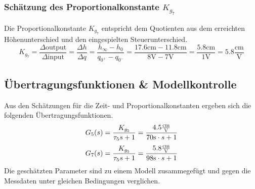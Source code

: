 \subsubsection{Schätzung des Proportionalkonstante $K_{g_7}$}
Die Proportionalkonstante $K_{g_7}$ entspricht dem Quotienten aus dem
erreichten Höhenunterschied und den eingespielten Steuerunterschied.
\[
	K_{g_7}
	= \frac{\Delta \text{output}}{\Delta \text{input}}
	= \frac{\Delta h}{\Delta q}
	= \frac{h_\infty - h_0}{q_{0^+} - q_{0^-}}
	= \frac{17.6\si{\centi\meter} - 11.8\si{\centi\meter}}{8\si{\volt}
		-  7\si{\volt}}
	= \frac{5.8\si{\centi\meter}}{1\si{\volt}}
	= 5.8 \frac{\si{\centi\meter}}{\si{\volt}}
\]

\subsection{Übertragungsfunktionen \& Modellkontrolle}
Aus den Schätzungen für die Zeit- und Proportionalkonstanten ergeben sich
die folgenden Übertragungsfunktionen.
\[
	G_5(s) 
	= \frac{K_{g_5}}{\tau_5 s + 1} 
	= \frac{4.5\si[per-mode = fraction]{\centi\meter\per\volt}
		}{70\si{\second} \cdot s + 1}
\]
\[
	G_7(s) 
	= \frac{K_{g_5}}{\tau_5 s + 1} 
	= \frac{5.8\si[per-mode = fraction]{\centi\meter\per\volt}
		}{98\si{\second} \cdot s + 1}
\]
Die geschätzten Parameter sind zu einem Modell zusammegefügt und gegen die
Messdaten unter gleichen Bedingungen verglichen.
